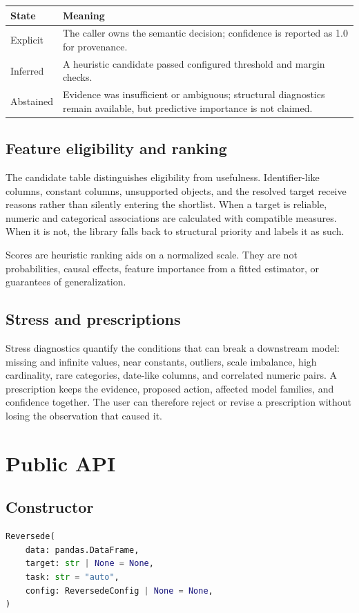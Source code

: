 \documentclass[10pt,a4paper,oneside]{article}
\begin{document}
\begin{center}
\begin{tabular}{p{4.0cm}p{10.3cm}}
\toprule
State & Meaning\\
\midrule
Explicit & The caller owns the semantic decision; confidence is reported as 1.0 for provenance.\\
Inferred & A heuristic candidate passed configured threshold and margin checks.\\
Abstained & Evidence was insufficient or ambiguous; structural diagnostics remain available, but predictive importance is not claimed.\\
\bottomrule
\end{tabular}
\end{center}

\subsection{Feature eligibility and ranking}
The candidate table distinguishes eligibility from usefulness. Identifier-like columns, constant
columns, unsupported objects, and the resolved target receive reasons rather than silently entering
the shortlist. When a target is reliable, numeric and categorical associations are calculated with
compatible measures. When it is not, the library falls back to structural priority and labels it as
such.

Scores are heuristic ranking aids on a normalized scale. They are not probabilities, causal effects,
feature importance from a fitted estimator, or guarantees of generalization.

\subsection{Stress and prescriptions}
Stress diagnostics quantify the conditions that can break a downstream model: missing and infinite
values, near constants, outliers, scale imbalance, high cardinality, rare categories, date-like
columns, and correlated numeric pairs. A prescription keeps the evidence, proposed action, affected
model families, and confidence together. The user can therefore reject or revise a prescription
without losing the observation that caused it.

\section{Public API}\label{sec:api}

\subsection{Constructor}
\begin{lstlisting}[language=Python]
Reversede(
    data: pandas.DataFrame,
    target: str | None = None,
    task: str = "auto",
    config: ReversedeConfig | None = None,
)
\end{lstlisting}
\end{document}
